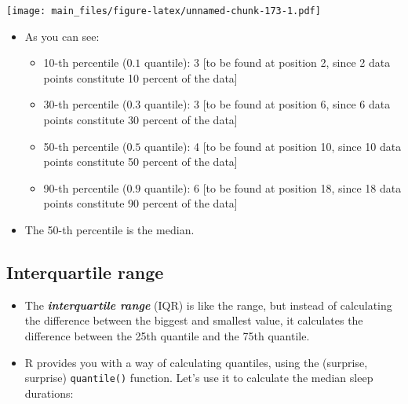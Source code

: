 \documentclass[
]{book}
\newenvironment{Shaded}{\begin{snugshade}}{\end{snugshade}}
\newcommand{\AttributeTok}[1]{\textcolor[rgb]{0.13,0.29,0.53}{#1}}
\newcommand{\DecValTok}[1]{\textcolor[rgb]{0.00,0.00,0.81}{#1}}
\newcommand{\FunctionTok}[1]{\textcolor[rgb]{0.13,0.29,0.53}{\textbf{#1}}}
\newcommand{\NormalTok}[1]{#1}
\newcommand{\SpecialCharTok}[1]{\textcolor[rgb]{0.81,0.36,0.00}{\textbf{#1}}}
\providecommand{\tightlist}{%
  \setlength{\itemsep}{0pt}\setlength{\parskip}{0pt}}
\begin{document}
\texttt{[image: main\_files/figure-latex/unnamed-chunk-173-1.pdf]}

\begin{itemize}
\tightlist
\item
  As you can see:

  \begin{itemize}
  \tightlist
  \item
    10-th percentile (\(0.1\) quantile): 3 {[}to be found at position 2, since 2 data points constitute 10 percent of the data{]}
  \item
    30-th percentile (\(0.3\) quantile): 3 {[}to be found at position 6, since 6 data points constitute 30 percent of the data{]}
  \item
    50-th percentile (\(0.5\) quantile): 4 {[}to be found at position 10, since 10 data points constitute 50 percent of the data{]}
  \item
    90-th percentile (\(0.9\) quantile): 6 {[}to be found at position 18, since 18 data points constitute 90 percent of the data{]}
  \end{itemize}
\item
  The 50-th percentile is the median.
\end{itemize}

\hypertarget{interquartile-range}{%
\subsection{Interquartile range}\label{interquartile-range}}

\begin{itemize}
\tightlist
\item
  The \textbf{\emph{interquartile range}} (IQR) is like the range, but instead of calculating the difference between the biggest and smallest value, it calculates the difference between the 25th quantile and the 75th quantile.
\item
  R provides you with a way of calculating quantiles, using the (surprise, surprise) \texttt{quantile()} function. Let's use it to calculate the median sleep durations:
\end{itemize}

\begin{Shaded}
\end{Shaded}
\end{document}
